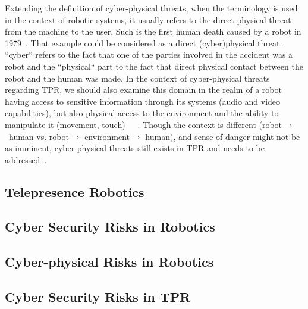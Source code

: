 Extending the definition of cyber-physical threats, when the terminology is used in the context of robotic systems, it usually refers to
the direct physical threat from the machine to the user. Such is the first human death caused by a robot in 1979~\cite[2]{robot_security_framework_2018}.
That example could be considered as a direct (cyber)physical threat. ``cyber`` refers to the fact that one of the parties involved in the
accident was a robot and the ``physical`` part to the fact that
direct physical contact between the robot and the human was made. In the context of cyber-physical threats regarding \ac{TPR}, we should also examine this domain in
the realm of a robot having access to sensitive information through its systems (audio and video
capabilities), but also physical access to the environment and the ability to manipulate it (movement, touch)~\cite[982]{
  role_of_security_in_human_robot_2017}~\cite[250]{
  role_of_cyber_security_in_higher_edu_2020}~\cite[11]{analyzing_cyber_physical_threats_2018}.
Though the context is different (robot~$\shortrightarrow$~human vs. robot~$\shortrightarrow$~environment~$\shortrightarrow$~human), and sense of
danger might not be as imminent, cyber-physical threats
still
exists in \ac{TPR}
and
needs to
be addressed~\cite[2]{cyber_sec_safet_robots_legal_2021}.



\subsection{Telepresence Robotics}


\subsection{Cyber Security Risks in Robotics}


\subsection{Cyber-physical Risks in Robotics}


\subsection{Cyber Security Risks in \ac{TPR}}



